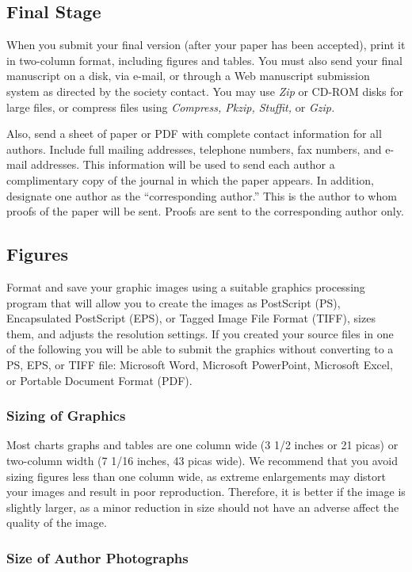 \subsection{Final Stage}
When you submit your final version (after your paper has been accepted), 
print it in two-column format, including figures and tables. You must also 
send your final manuscript on a disk, via e-mail, or through a Web 
manuscript submission system as directed by the society contact. You may use 
\emph{Zip} or CD-ROM disks for large files, or compress files using \emph{Compress, Pkzip, Stuffit,} or \emph{Gzip.} 

Also, send a sheet of paper or PDF with complete contact information for all 
authors. Include full mailing addresses, telephone numbers, fax numbers, and 
e-mail addresses. This information will be used to send each author a 
complimentary copy of the journal in which the paper appears. In addition, 
designate one author as the ``corresponding author.'' This is the author to 
whom proofs of the paper will be sent. Proofs are sent to the corresponding 
author only.

\subsection{Figures}
Format and save your graphic images using a suitable graphics processing 
program that will allow you to create the images as PostScript (PS), 
Encapsulated PostScript (EPS), or Tagged Image File Format (TIFF), sizes 
them, and adjusts the resolution settings. If you created your source files 
in one of the following you will be able to submit the graphics without 
converting to a PS, EPS, or TIFF file: Microsoft Word, Microsoft PowerPoint, 
Microsoft Excel, or Portable Document Format (PDF). 

\subsubsection*{Sizing of Graphics}

Most charts graphs and tables are one column wide (3 1/2 inches or 21 picas) 
or two-column width (7 1/16 inches, 43 picas wide). We recommend that you 
avoid sizing figures less than one column wide, as extreme enlargements may 
distort your images and result in poor reproduction. Therefore, it is better 
if the image is slightly larger, as a minor reduction in size should not 
have an adverse affect the quality of the image. 

\subsubsection*{Size of Author Photographs}

